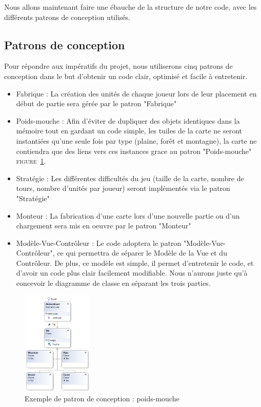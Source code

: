 Nous allons maintenant faire une ébauche de la structure de notre code, avec les différents patrons de conception utilisés.

\subsection{Patrons de conception}

Pour répondre aux impératifs du projet, nous utiliserons cinq patrons de conception dans le but d'obtenir un code clair, optimisé et facile à entretenir. 

\begin{itemize}
  \item Fabrique : La création des unités de chaque joueur lors de leur placement en début de partie sera gérée par le patron "Fabrique"
  \item Poids-mouche : Afin d'éviter de dupliquer des objets identiques dans la mémoire tout en gardant un code simple, les tuiles de la carte ne seront instantiées qu'une seule fois par type (plaine, forêt et montagne), la carte ne contiendra que des liens vers ces instances grace au patron "Poids-mouche" \textsc{figure~\ref{poids-mouche}}.
  \item Stratégie : Les différentes difficultés du jeu (taille de la carte, nombre de tours, nombre d'unités par joueur) seront implémentés via le patron "Stratégie"
  \item Monteur : La fabrication d'une carte lors d'une nouvelle partie ou d'un chargement sera mis en oeuvre par le patron "Monteur"
  \item Modèle-Vue-Contrôleur : Le code adoptera le patron "Modèle-Vue-Contrôleur", ce qui permettra de séparer le Modèle de la Vue et du Contrôleur. De plus, ce modèle est simple, il permet d'entretenir le code, et d'avoir un code plus clair facilement modifiable. Nous n'aurons juste qu'à concevoir le diagramme de classe en séparant les trois parties.
\end{itemize}

\begin{figure}[!h]
\centering
\label{poids-mouche}
\includegraphics[width=0.3\textwidth]{img/PoidsMouche.png}
\caption{Exemple de patron de conception : poids-mouche}
\end{figure}

